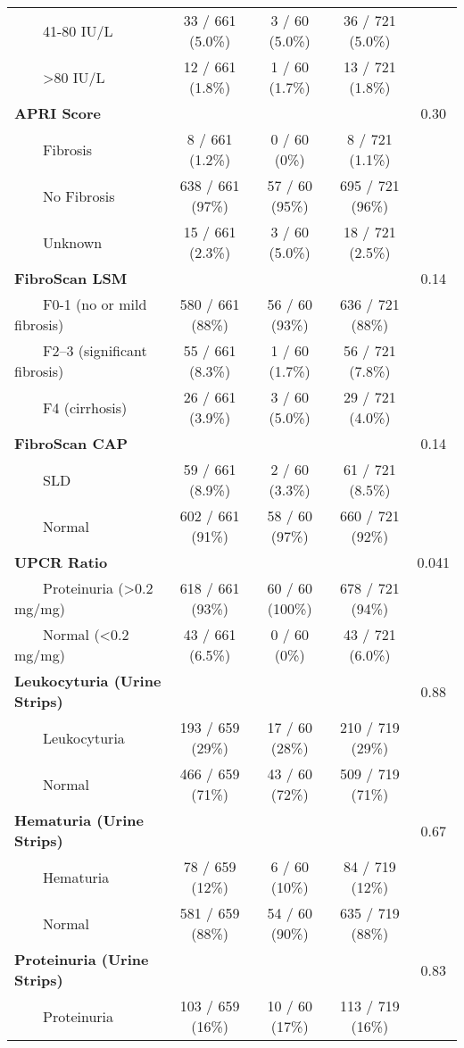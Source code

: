 \documentclass[
]{article}
\begin{document}
\begin{longtable}{lcccc}
    41-80 IU/L & 33 / 661 (5.0\%) & 3 / 60 (5.0\%) & 36 / 721 (5.0\%) &  \\ 
    >80 IU/L & 12 / 661 (1.8\%) & 1 / 60 (1.7\%) & 13 / 721 (1.8\%) &  \\ 
\textbf{APRI Score} &  &  &  & 0.30 \\ 
    Fibrosis & 8 / 661 (1.2\%) & 0 / 60 (0\%) & 8 / 721 (1.1\%) &  \\ 
    No Fibrosis & 638 / 661 (97\%) & 57 / 60 (95\%) & 695 / 721 (96\%) &  \\ 
    Unknown & 15 / 661 (2.3\%) & 3 / 60 (5.0\%) & 18 / 721 (2.5\%) &  \\ 
\textbf{FibroScan LSM} &  &  &  & 0.14 \\ 
    F0-1 (no or mild fibrosis) & 580 / 661 (88\%) & 56 / 60 (93\%) & 636 / 721 (88\%) &  \\ 
    F2–3 (significant fibrosis) & 55 / 661 (8.3\%) & 1 / 60 (1.7\%) & 56 / 721 (7.8\%) &  \\ 
    F4 (cirrhosis) & 26 / 661 (3.9\%) & 3 / 60 (5.0\%) & 29 / 721 (4.0\%) &  \\ 
\textbf{FibroScan CAP} &  &  &  & 0.14 \\ 
    SLD & 59 / 661 (8.9\%) & 2 / 60 (3.3\%) & 61 / 721 (8.5\%) &  \\ 
    Normal & 602 / 661 (91\%) & 58 / 60 (97\%) & 660 / 721 (92\%) &  \\ 
\textbf{UPCR Ratio} &  &  &  & 0.041 \\ 
    Proteinuria (>0.2 mg/mg) & 618 / 661 (93\%) & 60 / 60 (100\%) & 678 / 721 (94\%) &  \\ 
    Normal (<0.2 mg/mg) & 43 / 661 (6.5\%) & 0 / 60 (0\%) & 43 / 721 (6.0\%) &  \\ 
\textbf{Leukocyturia (Urine Strips)} &  &  &  & 0.88 \\ 
    Leukocyturia & 193 / 659 (29\%) & 17 / 60 (28\%) & 210 / 719 (29\%) &  \\ 
    Normal & 466 / 659 (71\%) & 43 / 60 (72\%) & 509 / 719 (71\%) &  \\ 
\textbf{Hematuria (Urine Strips)} &  &  &  & 0.67 \\ 
    Hematuria & 78 / 659 (12\%) & 6 / 60 (10\%) & 84 / 719 (12\%) &  \\ 
    Normal & 581 / 659 (88\%) & 54 / 60 (90\%) & 635 / 719 (88\%) &  \\ 
\textbf{Proteinuria (Urine Strips)} &  &  &  & 0.83 \\ 
    Proteinuria & 103 / 659 (16\%) & 10 / 60 (17\%) & 113 / 719 (16\%) &  \\ 

\end{longtable}
\end{document}
